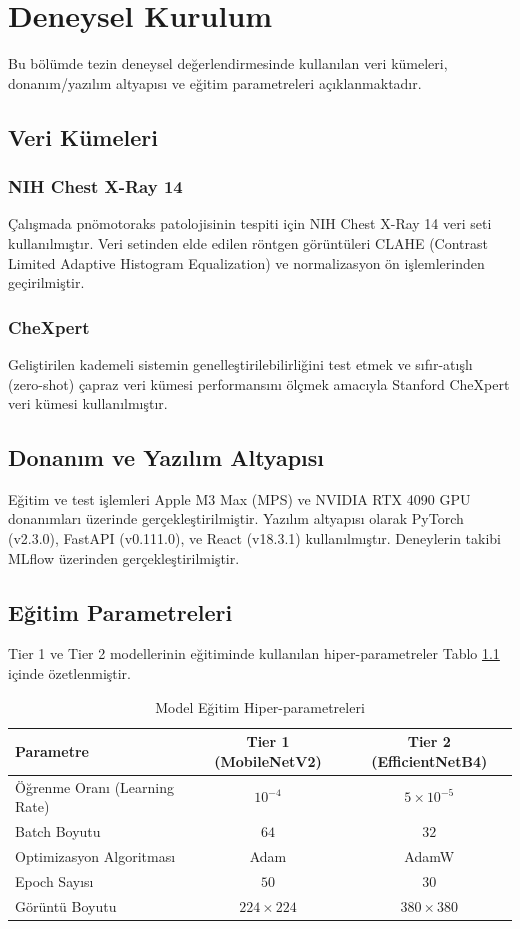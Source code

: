 \chapter{Deneysel Kurulum}
\label{ch:deneysel_kurulum}

Bu bölümde tezin deneysel değerlendirmesinde kullanılan veri kümeleri, donanım/yazılım altyapısı ve eğitim parametreleri açıklanmaktadır.

\section{Veri Kümeleri}
\subsection{NIH Chest X-Ray 14}
Çalışmada pnömotoraks patolojisinin tespiti için NIH Chest X-Ray 14 veri seti kullanılmıştır. Veri setinden elde edilen röntgen görüntüleri CLAHE (Contrast Limited Adaptive Histogram Equalization) ve normalizasyon ön işlemlerinden geçirilmiştir.

\subsection{CheXpert}
Geliştirilen kademeli sistemin genelleştirilebilirliğini test etmek ve sıfır-atışlı (zero-shot) çapraz veri kümesi performansını ölçmek amacıyla Stanford CheXpert veri kümesi kullanılmıştır.

\section{Donanım ve Yazılım Altyapısı}
Eğitim ve test işlemleri Apple M3 Max (MPS) ve NVIDIA RTX 4090 GPU donanımları üzerinde gerçekleştirilmiştir. Yazılım altyapısı olarak PyTorch (v2.3.0), FastAPI (v0.111.0), ve React (v18.3.1) kullanılmıştır. Deneylerin takibi MLflow üzerinden gerçekleştirilmiştir.

\section{Eğitim Parametreleri}
Tier 1 ve Tier 2 modellerinin eğitiminde kullanılan hiper-parametreler Tablo \ref{tab:hiperparametreler} içinde özetlenmiştir.

\begin{table}[htbp]
\centering
\caption{Model Eğitim Hiper-parametreleri}
\label{tab:hiperparametreler}
\begin{tabular}{lcc}
\toprule
\textbf{Parametre} & \textbf{Tier 1 (MobileNetV2)} & \textbf{Tier 2 (EfficientNetB4)} \\
\midrule
Öğrenme Oranı (Learning Rate) & $10^{-4}$ & $5 \times 10^{-5}$ \\
Batch Boyutu & $64$ & $32$ \\
Optimizasyon Algoritması & Adam & AdamW \\
Epoch Sayısı & $50$ & $30$ \\
Görüntü Boyutu & $224 \times 224$ & $380 \times 380$ \\
\bottomrule
\end{tabular}
\end{table}
